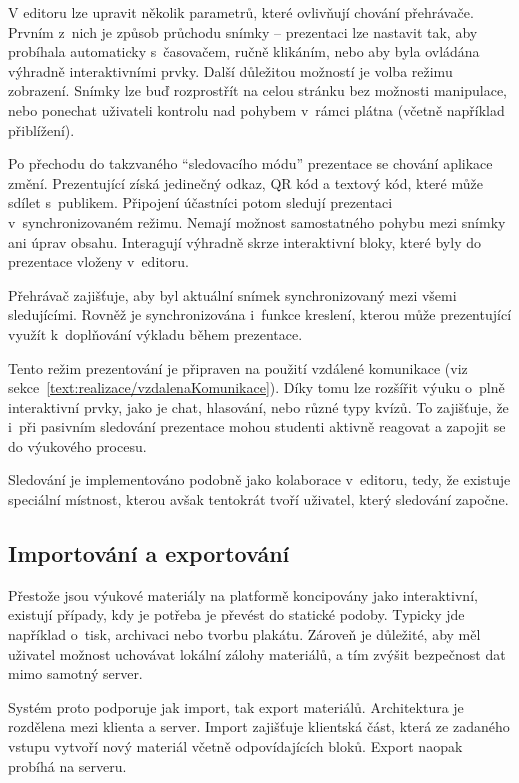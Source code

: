 V editoru lze upravit několik parametrů, které ovlivňují chování přehrávače.
Prvním z~nich je způsob průchodu snímky -- prezentaci lze nastavit tak, aby probíhala automaticky s~časovačem, ručně klikáním, nebo aby byla ovládána výhradně interaktivními prvky.
Další důležitou možností je volba režimu zobrazení.
Snímky lze buď rozprostřít na celou stránku bez možnosti manipulace, nebo ponechat uživateli kontrolu nad pohybem v~rámci plátna (včetně například přiblížení).

Po přechodu do takzvaného \enquote{sledovacího módu} prezentace se chování aplikace změní. 
Prezentující získá jedinečný odkaz, QR kód a textový kód, které může sdílet s~publikem. 
Připojení účastníci potom sledují prezentaci v~synchronizovaném režimu. 
Nemají možnost samostatného pohybu mezi snímky ani úprav obsahu. 
Interagují výhradně skrze interaktivní bloky, které byly do prezentace vloženy v~editoru.

Přehrávač zajišťuje, aby byl aktuální snímek synchronizovaný mezi všemi sledujícími.
Rovněž je synchronizována i~funkce kreslení, kterou může prezentující využít k~doplňování výkladu během prezentace.

Tento režim prezentování je připraven na použití vzdálené komunikace (viz sekce~\ref{text:realizace/vzdalenaKomunikace}).
Díky tomu lze rozšířit výuku o~plně interaktivní prvky, jako je chat, hlasování, nebo různé typy kvízů. 
To zajišťuje, že i~při pasivním sledování prezentace mohou studenti aktivně reagovat a zapojit se do výukového procesu.

Sledování je implementováno podobně jako kolaborace v~editoru, tedy, že existuje speciální místnost, kterou avšak tentokrát tvoří uživatel, který sledování započne.

\subsection{Importování a exportování}

Přestože jsou výukové materiály na platformě koncipovány jako interaktivní, existují případy, kdy je potřeba je převést do statické podoby.
Typicky jde například o~tisk, archivaci nebo tvorbu plakátu. 
Zároveň je důležité, aby měl uživatel možnost uchovávat lokální zálohy materiálů, a tím zvýšit bezpečnost dat mimo samotný server.

Systém proto podporuje jak import, tak export materiálů. 
Architektura je rozdělena mezi klienta a server. 
Import zajišťuje klientská část, která ze zadaného vstupu vytvoří nový materiál včetně odpovídajících bloků. 
Export naopak probíhá na serveru.

